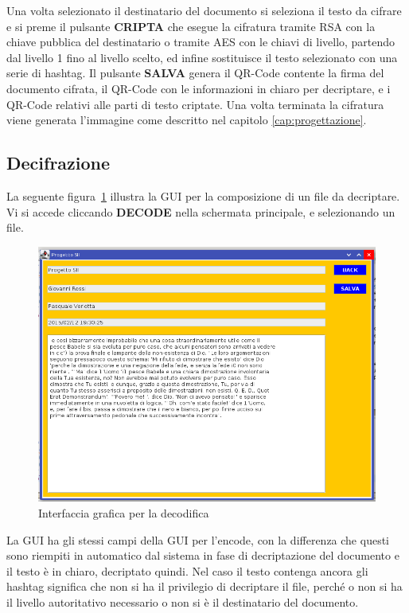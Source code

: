 Una volta selezionato il destinatario del documento si seleziona il testo da cifrare e si preme il pulsante \textbf{CRIPTA} che esegue la cifratura tramite RSA con la chiave pubblica del destinatario o tramite AES con le chiavi di livello, partendo dal livello 1 fino al livello scelto, ed infine sostituisce il testo selezionato con una serie di hashtag.
Il pulsante \textbf{SALVA} genera il QR-Code contente la firma del documento cifrata, il QR-Code con le informazioni in chiaro per decriptare, e i QR-Code relativi alle parti di testo criptate. Una volta terminata la cifratura viene generata l'immagine come descritto nel capitolo \ref{cap:progettazione}.

\subsection{Decifrazione}
La seguente figura~\ref{fig:decode} illustra la GUI per la composizione di un file da decriptare. Vi si accede cliccando \textbf{DECODE} nella schermata principale, e selezionando un file.
	
	\begin{center}	
		\begin{figure}[H]
		\centering
		\includegraphics[scale=0.6]{Immagini/readlayout}
		\caption[GUI di decode]{Interfaccia grafica per la decodifica}
		\label{fig:decode}
		\end{figure}
	\end{center}

La GUI ha gli stessi campi della GUI per l'encode, con la differenza che questi sono riempiti in automatico dal sistema in fase di decriptazione del documento e il testo è in chiaro, decriptato quindi.
Nel caso il testo contenga ancora gli hashtag significa che non si ha il privilegio di decriptare il file, perché o non si ha il livello autoritativo necessario o non si è il destinatario del documento.